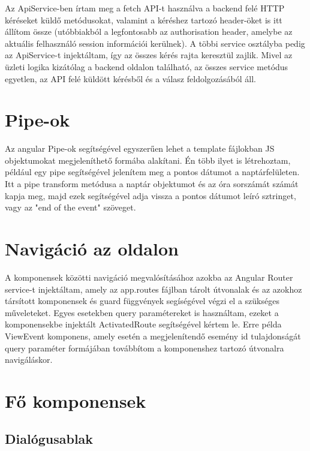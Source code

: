 \documentclass[a4paper,12pt]{report}
\theoremstyle{definition}
\theoremstyle{remark}
\begin{document}
Az ApiService-ben írtam meg a fetch API-t\cite{Fetchwebsite} használva a backend felé HTTP kéréseket küldő metódusokat, valamint a kéréshez tartozó header-öket is itt állítom össze (utóbbiakból a legfontosabb az authorisation header, amelybe az aktuális felhasználó session információi kerülnek). A többi service osztályba pedig az ApiService-t injektáltam, így az összes kérés rajta keresztül zajlik.  Mivel az üzleti logika kizátólag a backend oldalon található, az összes service metódus egyetlen, az API felé küldött kérésből és a válasz feldolgozásából áll.

\section{Pipe-ok}

Az angular Pipe-ok\cite{Pipewebsite} segítségével egyszerűen lehet a template fájlokban JS objektumokat megjeleníthető formába alakítani. Én több ilyet is létrehoztam, például egy pipe segítségével jelenítem meg a pontos dátumot a naptárfelületen. Itt a pipe transform metódusa a naptár objektumot és az óra sorszámát számát kapja meg, majd ezek segítségével adja vissza a pontos dátumot leíró sztringet, vagy az "end of the event" szöveget.

\section{Navigáció az oldalon}

A komponensek közötti navigáció megvalósításához azokba az Angular Router service-t\cite{Routerwebsite} injektáltam, amely az app.routes fájlban tárolt útvonalak és az azokhoz társított komponensek és guard függvények segíségével végzi el a szükséges műveleteket. Egyes esetekben query paramétereket is használtam, ezeket a komponensekbe injektált ActivatedRoute segítségével kértem le. Erre példa ViewEvent komponens, amely esetén a megjelenítendő esemény id tulajdonságát query paraméter formájában továbbítom a komponenshez tartozó útvonalra navigáláskor.

\section{Fő komponensek}

	\subsection{Dialógusablak}
\end{document}
